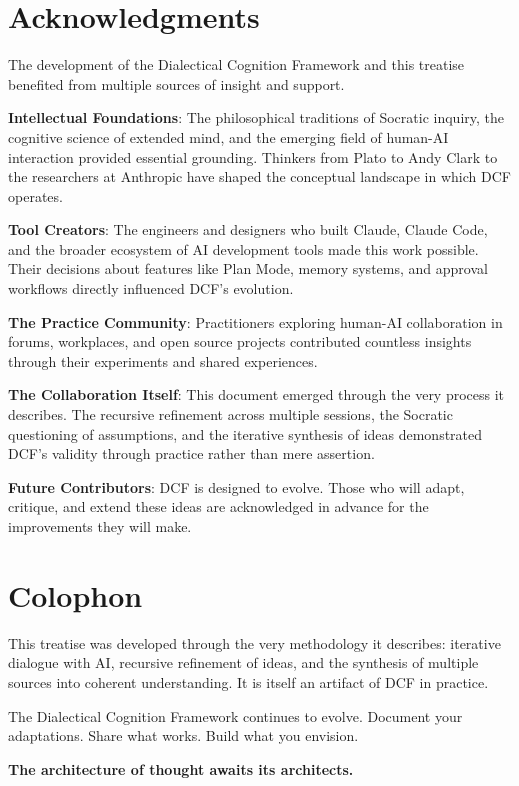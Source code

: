 \chapter*{Acknowledgments}

The development of the Dialectical Cognition Framework and this treatise benefited from multiple sources of insight and support.

\textbf{Intellectual Foundations}: The philosophical traditions of Socratic inquiry, the cognitive science of extended mind, and the emerging field of human-AI interaction provided essential grounding. Thinkers from Plato to Andy Clark to the researchers at Anthropic have shaped the conceptual landscape in which DCF operates.

\textbf{Tool Creators}: The engineers and designers who built Claude, Claude Code, and the broader ecosystem of AI development tools made this work possible. Their decisions about features like Plan Mode, memory systems, and approval workflows directly influenced DCF's evolution.

\textbf{The Practice Community}: Practitioners exploring human-AI collaboration in forums, workplaces, and open source projects contributed countless insights through their experiments and shared experiences.

\textbf{The Collaboration Itself}: This document emerged through the very process it describes. The recursive refinement across multiple sessions, the Socratic questioning of assumptions, and the iterative synthesis of ideas demonstrated DCF's validity through practice rather than mere assertion.

\textbf{Future Contributors}: DCF is designed to evolve. Those who will adapt, critique, and extend these ideas are acknowledged in advance for the improvements they will make.


\chapter*{Colophon}

This treatise was developed through the very methodology it describes: iterative dialogue with AI, recursive refinement of ideas, and the synthesis of multiple sources into coherent understanding. It is itself an artifact of DCF in practice.

The Dialectical Cognition Framework continues to evolve. Document your adaptations. Share what works. Build what you envision.

\begin{center}
\textbf{The architecture of thought awaits its architects.}
\end{center}
